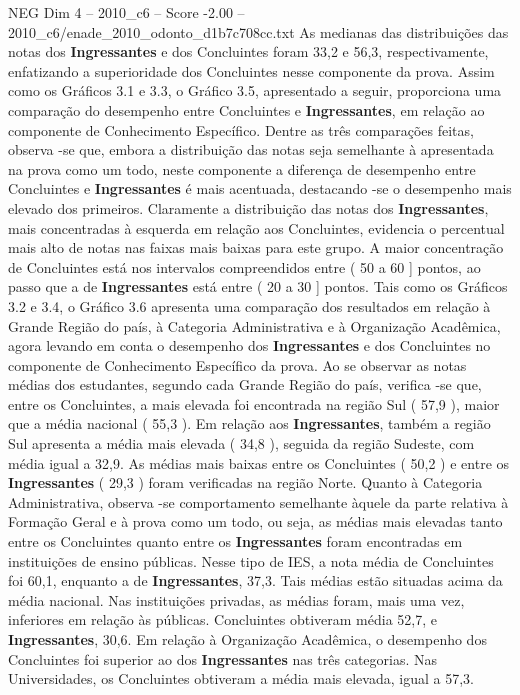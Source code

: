 \begin{textsample}{NEG Dim 4 – 2010\_c6 – Score -2.00 – 2010\_c6/enade\_2010\_odonto\_d1b7c708cc.txt}
As medianas das distribuições das notas dos \textbf{Ingressantes} e dos Concluintes foram 33,2 e 56,3, respectivamente, enfatizando a superioridade dos Concluintes nesse componente da prova.
Assim como os Gráficos 3.1 e 3.3, o Gráfico 3.5, apresentado a seguir, proporciona uma comparação do desempenho entre Concluintes e \textbf{Ingressantes}, em relação ao componente de Conhecimento Específico.
Dentre as três comparações feitas, observa -se que, embora a distribuição das notas seja semelhante à apresentada na prova como um todo, neste componente a diferença de desempenho entre Concluintes e \textbf{Ingressantes} é mais acentuada, destacando -se o desempenho mais elevado dos primeiros.
Claramente a distribuição das notas dos \textbf{Ingressantes}, mais concentradas à esquerda em relação aos Concluintes, evidencia o percentual mais alto de notas nas faixas mais baixas para este grupo.
A maior concentração de Concluintes está nos intervalos compreendidos entre ( 50 a 60 ] pontos, ao passo que a de \textbf{Ingressantes} está entre ( 20 a 30 ] pontos.
Tais como os Gráficos 3.2 e 3.4, o Gráfico 3.6 apresenta uma comparação dos resultados em relação à Grande Região do país, à Categoria Administrativa e à Organização Acadêmica, agora levando em conta o desempenho dos \textbf{Ingressantes} e dos Concluintes no componente de Conhecimento Específico da prova.
Ao se observar as notas médias dos estudantes, segundo cada Grande Região do país, verifica -se que, entre os Concluintes, a mais elevada foi encontrada na região Sul ( 57,9 ), maior que a média nacional ( 55,3 ).
Em relação aos \textbf{Ingressantes}, também a região Sul apresenta a média mais elevada ( 34,8 ), seguida da região Sudeste, com média igual a 32,9.
As médias mais baixas entre os Concluintes ( 50,2 ) e entre os \textbf{Ingressantes} ( 29,3 ) foram verificadas na região Norte.
Quanto à Categoria Administrativa, observa -se comportamento semelhante àquele da parte relativa à Formação Geral e à prova como um todo, ou seja, as médias mais elevadas tanto entre os Concluintes quanto entre os \textbf{Ingressantes} foram encontradas em instituições de ensino públicas.
Nesse tipo de IES, a nota média de Concluintes foi 60,1, enquanto a de \textbf{Ingressantes}, 37,3.
Tais médias estão situadas acima da média nacional.
Nas instituições privadas, as médias foram, mais uma vez, inferiores em relação às públicas.
Concluintes obtiveram média 52,7, e \textbf{Ingressantes}, 30,6.
Em relação à Organização Acadêmica, o desempenho dos Concluintes foi superior ao dos \textbf{Ingressantes} nas três categorias.
Nas Universidades, os Concluintes obtiveram a média mais elevada, igual a 57,3.

\end{textsample}
